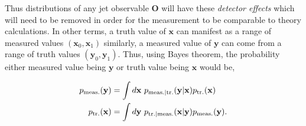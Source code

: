 Thus distributions of any jet observable \(\mathbf{O}\) will have these \emph{detector effects} which will need to be removed in order for the measurement to be comparable to theory calculations. In other terms, a truth value of \(\mathbf{x}\) can manifest as a range of measured values \((\mathbf{x}_0, \mathbf{x}_1)\) similarly, a measured value of \(\mathbf{y}\) can come from a range of truth values \((\mathbf{y}_0, \mathbf{y}_1)\).  Thus, using Bayes theorem, the probability either measured value being  \(\mathbf{y}\)  or truth value being  \(\mathbf{x}\) would be,

\begin{align}
	\label{eq:trMeas}
	p_\mathrm{meas.}(\mathbf{y}) &= \int d\mathbf{x}~p_\mathrm{meas.|tr.}(\mathbf{y} |  \mathbf{x}) p_\mathrm{tr.}(\mathbf{x}) \notag\\
	p_\mathrm{tr.}(\mathbf{x}) &= \int d\mathbf{y}~p_\mathrm{tr.|meas.}(\mathbf{x} |  \mathbf{y}) p_\mathrm{meas.}(\mathbf{y}).
\end{align}



